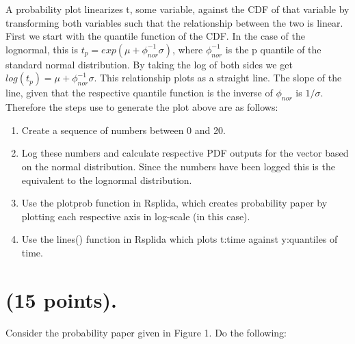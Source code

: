 \documentclass{article}
\begin{document}
A probability plot linearizes t, some variable, against the CDF of that variable by transforming both variables such that the relationship between the two is linear.  First we start with the quantile function of the CDF.  In the case of the lognormal, this is \(t_p = exp(\mu + \phi_{nor}^{-1} \sigma)\), where \(\phi_{nor}^{-1}\) is the p quantile of the standard normal distribution.  By taking the log of both sides we get \(log(t_p) = \mu + \phi_{nor}^{-1} \sigma\).  This relationship plots as a straight line.  The slope of the line, given that the respective quantile function is the inverse of  \(\phi_{nor}\) is \(1/\sigma\).\\

Therefore the steps use to generate the plot above are as follows:\\
\begin{enumerate}
\item Create a sequence of numbers between 0 and 20.\\

\item Log these numbers and calculate respective PDF outputs for the vector based on the normal distribution.  Since the numbers have been logged this is the equivalent to the lognormal distribution.

\item Use the plotprob function in Rsplida, which creates probability paper by plotting each respective axis in log-scale (in this case).

\item Use the lines() function in Rsplida which plots t:time against y:quantiles of time.
\end{enumerate}
\newpage


\section{(15 points).}
Consider the probability paper given in Figure 1. Do the following:\\
\end{document}
